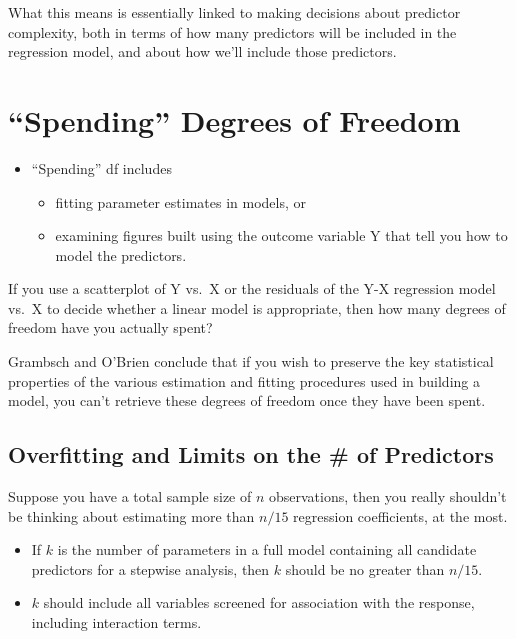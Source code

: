 \documentclass[]{book}
\providecommand{\tightlist}{%
  \setlength{\itemsep}{0pt}\setlength{\parskip}{0pt}}
\theoremstyle{definition}
\theoremstyle{definition}
\theoremstyle{definition}
\theoremstyle{remark}
\begin{document}
What this means is essentially linked to making decisions about
predictor complexity, both in terms of how many predictors will be
included in the regression model, and about how we'll include those
predictors.

\section{\texorpdfstring{``Spending'' Degrees of
Freedom}{Spending Degrees of Freedom}}\label{spending-degrees-of-freedom}

\begin{itemize}
\tightlist
\item
  ``Spending'' df includes

  \begin{itemize}
  \tightlist
  \item
    fitting parameter estimates in models, or
  \item
    examining figures built using the outcome variable Y that tell you
    how to model the predictors.
  \end{itemize}
\end{itemize}

If you use a scatterplot of Y vs.~X or the residuals of the Y-X
regression model vs.~X to decide whether a linear model is appropriate,
then how many degrees of freedom have you actually spent?

Grambsch and O'Brien conclude that if you wish to preserve the key
statistical properties of the various estimation and fitting procedures
used in building a model, you can't retrieve these degrees of freedom
once they have been spent.

\subsection{Overfitting and Limits on the \# of
Predictors}\label{overfitting-and-limits-on-the-of-predictors}

Suppose you have a total sample size of \(n\) observations, then you
really shouldn't be thinking about estimating more than \(n / 15\)
regression coefficients, at the most.

\begin{itemize}
\tightlist
\item
  If \(k\) is the number of parameters in a full model containing all
  candidate predictors for a stepwise analysis, then \(k\) should be no
  greater than \(n / 15\).
\item
  \(k\) should include all variables screened for association with the
  response, including interaction terms.
\end{itemize}
\end{document}
